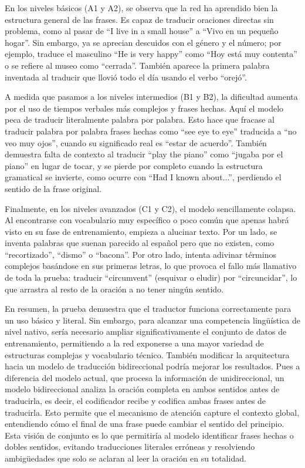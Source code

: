 En los niveles básicos (A1 y A2), se observa que la red ha aprendido bien la estructura general de las frases. Es capaz de traducir oraciones 
directas sin problema, como al pasar de ``I live in a small house'' a ``Vivo en un pequeño hogar''. Sin embargo, ya se aprecian descuidos con 
el género y el número; por ejemplo, traduce el masculino ``He is very happy'' como ``Hoy está muy contenta'' o se refiere al museo como 
``cerrada''. También aparece la primera palabra inventada al traducir que llovió todo el día usando el verbo ``orejó''.

A medida que pasamos a los niveles intermedios (B1 y B2), la dificultad aumenta por el uso de tiempos verbales más complejos y frases hechas. 
Aquí el modelo peca de traducir literalmente palabra por palabra. Esto hace que fracase al traducir palabra por palabra frases hechas como 
``see eye to eye'' traducida a ``no veo muy ojos'', cuando su significado real es ``estar de acuerdo''. También demuestra falta de contexto 
al traducir ``play the piano'' como ``jugaba por el piano'' en lugar de tocar, y se pierde por completo cuando la estructura gramatical se 
invierte, como ocurre con ``Had I known about...'', perdiendo el sentido de la frase original.

Finalmente, en los niveles avanzados (C1 y C2), el modelo sencillamente colapsa. Al encontrarse con vocabulario muy específico o poco común 
que apenas habrá visto en su fase de entrenamiento, empieza a alucinar texto. Por un lado, se inventa palabras que suenan parecido al español 
pero que no existen, como ``recortizado'', ``dismo'' o ``bacona''. Por otro lado, intenta adivinar términos complejos basándose en sus primeras 
letras, lo que provoca el fallo más llamativo de toda la prueba: traducir ``circumvent'' (esquivar o eludir) por ``circuncidar'', lo que arrastra 
al resto de la oración a no tener ningún sentido.

En resumen, la prueba demuestra que el traductor funciona correctamente para un uso básico y literal. Sin embargo, para alcanzar una competencia 
lingüística de nivel nativo, sería necesario ampliar significativamente el conjunto de datos de entrenamiento, permitiendo a la red exponerse a 
una mayor variedad de estructuras complejas y vocabulario técnico. También modificar la arquitectura hacia un modelo de traducción bidireccional 
podría mejorar los resultados. Pues a diferencia del modelo actual, que procesa la información de unidireccional, un modelo bidireccional analiza 
la oración completa en ambos sentidos antes de traducirla, es decir, el codificador recibe y codifica ambas frases antes de traducirla. 
Esto permite que el mecanismo de atención capture el contexto global, entendiendo cómo el final de una frase puede cambiar el sentido del 
principio. Esta visión de conjunto es lo que permitiría al modelo identificar frases hechas o dobles sentidos, evitando traducciones literales 
erróneas y resolviendo ambigüedades que solo se aclaran al leer la oración en su totalidad.


